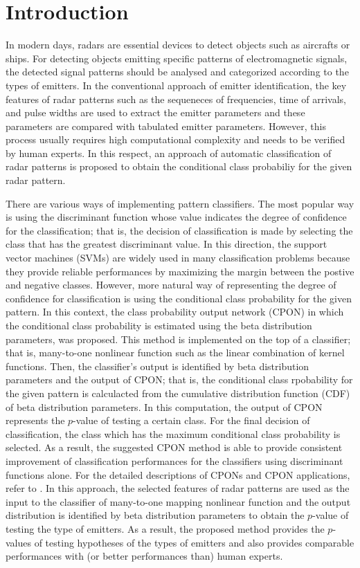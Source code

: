 \documentclass[runningheads,a4paper]{llncs}
\begin{document}
\section{Introduction}

In modern days, radars are essential devices to detect objects such as aircrafts or ships. For detecting objects emitting specific patterns of
electromagnetic signals, the detected signal patterns should be analysed and categorized according to the types of emitters. In the conventional
approach of emitter identification, the key features of radar patterns such as the sequeneces of frequencies, time of arrivals, and pulse widths are used
to extract the emitter parameters and these parameters are compared with tabulated emitter parameters. However, this process usually requires high
computational complexity and needs to be verified by human experts. In this respect, an approach of automatic classification of
radar patterns is proposed to obtain the conditional class probabiliy for the given radar pattern.

There are various ways of implementing pattern classifiers. The most popular way is using the discriminant function whose value
indicates the degree of confidence for the classification; that is, the decision of classification is made by selecting the class that
has the greatest discriminant value. In this direction, the support vector machines (SVMs) \cite{cit:Vp} are widely used in many
classification problems because they provide reliable performances by maximizing the margin between the postive and negative classes.
However, more natural way of representing the degree of confidence for classification is using the conditional class probability for
the given pattern. In this context, the class probability output network (CPON) in which
the conditional class probability is estimated using the beta distribution parameters, was proposed.  This method is implemented on the top of
a classifier; that is, many-to-one nonlinear function such as the linear combination of kernel functions. Then, the classifier's output
is identified by beta distribution parameters and the output of CPON; that is, the conditional class rpobability for the given pattern
is calculacted from the cumulative distribution function (CDF) of beta distribution parameters. 
In this computation, the output of CPON represents the $p$-value of testing a certain class. For the final decision of classification,
the class which has the maximum conditional class probability is selected.
As a result, the suggested CPON method is able to provide consistent improvement of classification
performances for the classifiers using discriminant functions alone. For the detailed descriptions of CPONs and CPON applications,
refer to \cite{cit:PK,cit:HKH}. In this approach, the selected features of radar patterns are used as the input to the classifier of many-to-one mapping nonlinear
function and the output distribution is identified by beta distribution parameters to obtain the $p$-value of testing the type of emitters.
As a result, the proposed method provides the $p$-values of testing hypotheses of the types of emitters and
also provides comparable performances with (or better performances than) human experts.
\end{document}
